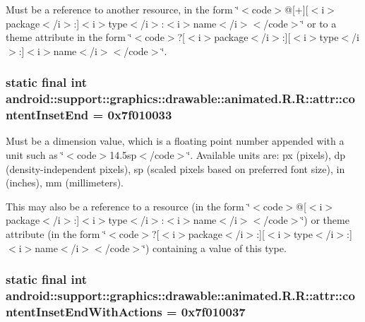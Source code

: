 Must be a reference to another resource, in the form \char`\"{}$<$code$>$@\mbox{[}+\mbox{]}\mbox{[}$<$i$>$package$<$/i$>$:\mbox{]}$<$i$>$type$<$/i$>$:$<$i$>$name$<$/i$>$$<$/code$>$\char`\"{} or to a theme attribute in the form \char`\"{}$<$code$>$?\mbox{[}$<$i$>$package$<$/i$>$:\mbox{]}\mbox{[}$<$i$>$type$<$/i$>$:\mbox{]}$<$i$>$name$<$/i$>$$<$/code$>$\char`\"{}. \hypertarget{classandroid_1_1support_1_1graphics_1_1drawable_1_1animated_1_1_r_1_1attr_54c6d621d7b930d8483ad8d99cd6cd36}{
\subsubsection[{contentInsetEnd}]{\setlength{\rightskip}{0pt plus 5cm}static final int android::support::graphics::drawable::animated.R.R::attr::contentInsetEnd = 0x7f010033}}
\label{classandroid_1_1support_1_1graphics_1_1drawable_1_1animated_1_1_r_1_1attr_54c6d621d7b930d8483ad8d99cd6cd36}


Must be a dimension value, which is a floating point number appended with a unit such as \char`\"{}$<$code$>$14.5sp$<$/code$>$\char`\"{}. Available units are: px (pixels), dp (density-independent pixels), sp (scaled pixels based on preferred font size), in (inches), mm (millimeters). 

This may also be a reference to a resource (in the form \char`\"{}$<$code$>$@\mbox{[}$<$i$>$package$<$/i$>$:\mbox{]}$<$i$>$type$<$/i$>$:$<$i$>$name$<$/i$>$$<$/code$>$\char`\"{}) or theme attribute (in the form \char`\"{}$<$code$>$?\mbox{[}$<$i$>$package$<$/i$>$:\mbox{]}\mbox{[}$<$i$>$type$<$/i$>$:\mbox{]}$<$i$>$name$<$/i$>$$<$/code$>$\char`\"{}) containing a value of this type. \hypertarget{classandroid_1_1support_1_1graphics_1_1drawable_1_1animated_1_1_r_1_1attr_48dfa16ec4f3417833240f51ba8551bb}{
\subsubsection[{contentInsetEndWithActions}]{\setlength{\rightskip}{0pt plus 5cm}static final int android::support::graphics::drawable::animated.R.R::attr::contentInsetEndWithActions = 0x7f010037}}
\label{classandroid_1_1support_1_1graphics_1_1drawable_1_1animated_1_1_r_1_1attr_48dfa16ec4f3417833240f51ba8551bb}


